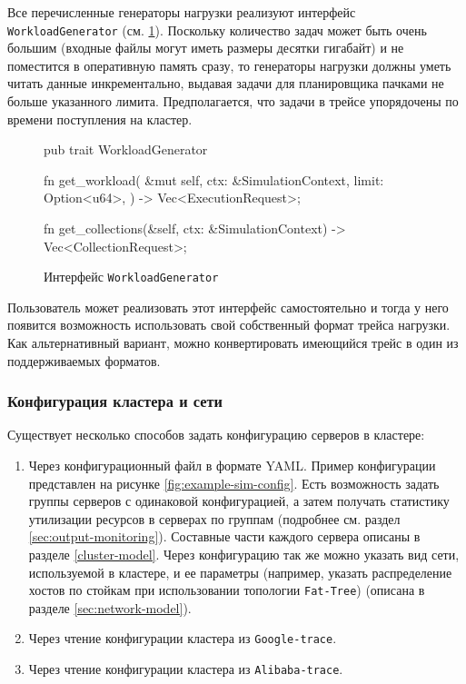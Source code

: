 Все перечисленные генераторы нагрузки реализуют интерфейс \texttt{WorkloadGenerator} (см. \ref{fig:workload-generator-trait}). Поскольку количество задач может быть очень большим (входные файлы могут иметь размеры десятки гигабайт) и не поместится в оперативную память сразу, то генераторы нагрузки должны уметь читать данные инкрементально, выдавая задачи для планировщика пачками не больше указанного лимита. Предполагается, что задачи в трейсе упорядочены по времени поступления на кластер. 
\begin{figure}[h!]
    \footnotesize
\begin{rustcode}
pub trait WorkloadGenerator {
  fn get_workload(
    &mut self, ctx: &SimulationContext, limit: Option<u64>,
  ) -> Vec<ExecutionRequest>;
  
  fn get_collections(&self, ctx: &SimulationContext) -> Vec<CollectionRequest>;
}
\end{rustcode}
    \caption{Интерфейс \texttt{WorkloadGenerator}}
    \label{fig:workload-generator-trait}
\end{figure}

Пользователь может реализовать этот интерфейс самостоятельно и тогда у него появится возможность использовать свой собственный формат трейса нагрузки. Как альтернативный вариант, можно конвертировать имеющийся трейс в один из поддерживаемых форматов.

\subsubsection{Конфигурация кластера и сети}

Существует несколько способов задать конфигурацию серверов в кластере: 
\begin{enumerate}
    \item Через конфигурационный файл в формате YAML. Пример конфигурации представлен на рисунке \ref{fig:example-sim-config}. Есть возможность задать группы серверов с одинаковой конфигурацией, а затем получать статистику утилизации ресурсов в серверах по группам (подробнее см. раздел \ref{sec:output-monitoring}). Составные части каждого сервера описаны в разделе \ref{cluster-model}. Через конфигурацию так же можно указать вид сети, используемой в кластере, и ее параметры (например, указать распределение хостов по стойкам при использовании топологии \texttt{Fat-Tree}) (описана в разделе \ref{sec:network-model}).
    \item Через чтение конфигурации кластера из \texttt{Google-trace}.
    \item Через чтение конфигурации кластера из \texttt{Alibaba-trace}.
\end{enumerate}

